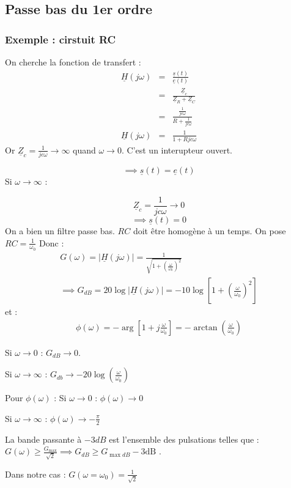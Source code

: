 \subsection{Passe bas du 1er ordre}
\subsubsection{Exemple : cirstuit RC}

On cherche la fonction de transfert : 
\begin{eqnarray*}
    \underline{H}(j \omega ) &=& \frac{\underline{s}(t)}{\underline{e}(t)} \\
    &=& \frac{\underline{Z}_{c}}{\underline{Z}_{R} + \underline{Z}_{C}} \\
    &=& \frac{\frac{1}{jc \omega }}{R + \frac{1}{jc \omega }} \\
    \underline{H}(j \omega )&=& \frac{1}{1+Rjc \omega}
\end{eqnarray*}
Or \(\underline{Z}_{c} = \frac{1}{jc \omega } \to \infty \) quand \(\omega \to 0\). C'est un interupteur ouvert. \par
\[
    \implies \underline{s}(t) = \underline{e}(t)
\]
Si \(\omega  \to \infty \) : \par
\[
    \underline{Z}_{c} = \frac{1}{jc \omega } \to 0
\]
\[
    \implies \underline{s}(t) = 0
\]
On a bien un filtre passe bas. 
\(RC\) doit être homogène à un temps. On pose \(RC = \frac{1}{\omega_{0}}\) 
Donc : 
\begin{eqnarray*}
    G(\omega) = \lvert \underline{H}(j \omega ) \rvert = \frac{1}{\sqrt{1+ (\frac{\omega}{\omega _{0}})^{2}}} \\
    \implies G_{dB} = 20 \log \lvert \underline{H}(j \omega ) \rvert = - 10 \log [1+(\frac{\omega}{\omega _{0}})^{2}]      
\end{eqnarray*}
et : 
\begin{eqnarray*}
    \phi(\omega ) = -\arg [1+j \frac{\omega}{\omega _{0}}] = -\arctan (\frac{\omega}{\omega _{0}})
\end{eqnarray*}

Si \(\omega \to 0\) : \(G_{dB} \to 0\). \par
Si \(\omega \to \infty \) : \(G_{db} \to -20 \log(\frac{\omega}{\omega_{0}})\)  \par
Pour \(\phi(\omega )\) :
Si \(\omega \to 0 \) : \(\phi (\omega) \to 0 \) \par
Si \(\omega \to \infty \) : \(\phi (\omega ) \to -\frac{\pi}{2}\)

\begin{definition}
    La bande passante à \(-3dB\) est l'ensemble des pulsations telles que : \(G(\omega ) \geq \frac{G_{\max}}{\sqrt{2}} \implies G_{dB} \geq G_{\max dB} - 3 \text{dB   }\). \par
    Dans notre cas : \(G(\omega = \omega_{0} ) = \frac{1}{\sqrt{2}}\)  
\end{definition}

